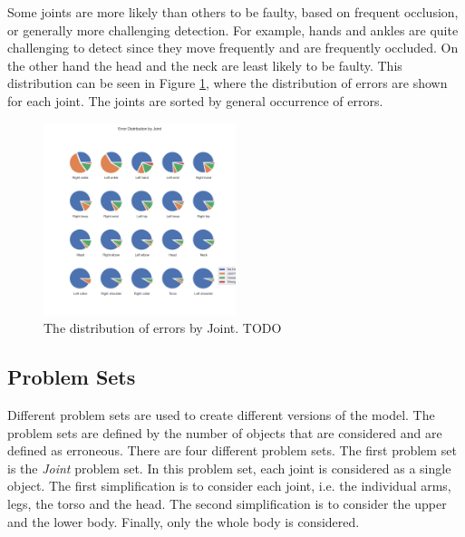 Some joints are more likely than others to be faulty, based on frequent occlusion, or generally more challenging detection. For example, hands and ankles are quite challenging to detect since they move frequently and are frequently occluded. On the other hand the head and the neck are least likely to be faulty. This distribution can be seen in Figure \ref{fig:statistics_err_dist_joint}, where the distribution of errors are shown for each joint. The joints are sorted by general occurrence of errors.

\begin{figure}
  \centering
  \includegraphics[width=0.5\textwidth]{figures/Data/Error_Distribution_by_Joint.png}
  \caption[Error Distribution by Joint]{The distribution of errors by Joint. TODO}
  \label{fig:statistics_err_dist_joint}
\end{figure}

\subsection{Problem Sets}
\label{sec:problem_set}

Different problem sets are used to create different versions of the model. The problem sets are defined by the number of objects that are considered and are defined as erroneous. There are four different problem sets. The first problem set is the \textit{Joint} problem set. In this problem set, each joint is considered as a single object. The first simplification is to consider each joint, i.e. the individual arms, legs, the torso and the head. The second simplification is to consider the upper and the lower body. Finally, only the whole body is considered.